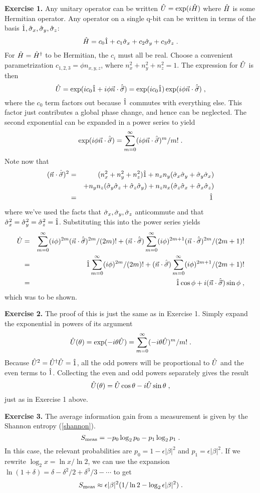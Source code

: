 {\bf Exercise 1.}  Any unitary operator can be written
${\hat U} = \exp(i{\hat H})$ where ${\hat H}$ is some Hermitian operator.  Any operator on
a single q-bit can be written in terms of the basis ${\hat 1},{\hat\sigma_x},{\hat\sigma_y},{\hat\sigma_z}$:
\[
{\hat H} = c_0 {\hat 1} + c_1 {\hat\sigma_x} + c_2 {\hat\sigma_y} + c_3 {\hat\sigma_z} \;.
\]
For ${\hat H}={\hat H}^\dagger$ to be Hermitian, the $c_i$ must all be real.  Choose
a convenient parametrization $c_{1,2,3} = \phi n_{x,y,z}$, where
$n_x^2 + n_y^2 + n_z^2 = 1$.  The expression for ${\hat U}$ is then
\[
{\hat U} = \exp(i c_0 {\hat 1} + i\phi{\vec n}\cdot{\hat{\vec\sigma}})
  = \exp(i c_0 {\hat 1}) \exp(i\phi{\vec n}\cdot{\hat{\vec\sigma}}) \;,
\]
where the $c_0$ term factors out because ${\hat 1}$ commutes with everything
else.  This factor just contributes a global phase change, and hence
can be neglected.  The second exponential can be expanded in a power
series to yield
\[
\exp(i\phi{\vec n}\cdot{\hat{\vec\sigma}})
  = \sum_{m=0}^\infty (i\phi{\vec n}\cdot{\hat{\vec\sigma}})^m/m! \;.
\]
Note now that
\begin{eqnarray}
({\vec n}\cdot{\hat{\vec\sigma}})^2 &=& (n_x^2+n_y^2+n_z^2) {\hat 1}
  + n_x n_y ({\hat\sigma_x}{\hat\sigma_y} + {\hat\sigma_y}{\hat\sigma_x}) \nonumber\\
&& + n_y n_z ({\hat\sigma_y}{\hat\sigma_z} + {\hat\sigma_z}{\hat\sigma_y})
  + n_z n_x ({\hat\sigma_z}{\hat\sigma_x} + {\hat\sigma_x}{\hat\sigma_z}) \nonumber\\
&=& {\hat 1} \, \nonumber
\end{eqnarray}
where we've used the facts that ${\hat\sigma_x},{\hat\sigma_y},{\hat\sigma_z}$ anticommute and that
${\hat\sigma_x}^2 = {\hat\sigma_y}^2 = {\hat\sigma_z}^2 = {\hat 1}$.  Substituting this into the power series
yields
\begin{eqnarray}
{\hat U} &=& \sum_{m=0}^\infty (i\phi)^{2m} ({\vec n}\cdot{\hat{\vec\sigma}})^{2m}/(2m)!
 + ({\vec n}\cdot{\hat{\vec\sigma}}) \sum_{m=0}^\infty (i\phi)^{2m+1}
  ({\vec n}\cdot{\hat{\vec\sigma}})^{2m}/(2m+1)! \nonumber\\
&=& {\hat 1} \sum_{m=0}^\infty (i\phi)^{2m}/(2m)!
 + ({\vec n}\cdot{\hat{\vec\sigma}}) \sum_{m=0}^\infty (i\phi)^{2m+1}/(2m+1)! \nonumber\\
&=& {\hat 1} \cos\phi + i({\vec n}\cdot{\hat{\vec\sigma}})\sin\phi \;, \nonumber
\end{eqnarray}
which was to be shown.

{\bf Exercise 2.}  The proof of this is just the same as in Exercise 1.
Simply expand the exponential in powers of its argument
\[
{\hat U}(\theta) = \exp(-i\theta{\hat U}) = \sum_{m=0}^\infty (-i\theta{\hat U})^m/m! \;.
\]
Because ${\hat U}^2={\hat U^\dagger}{\hat U}={\hat 1}$, all the odd
powers will be proportional to ${\hat U}$ and the even terms to ${\hat 1}$.
Collecting the even and odd powers separately gives the result
\[
{\hat U}(\theta) = {\hat U} \cos\theta - i {\hat U} \sin\theta \;,
\]
just as in Exercise 1 above.


{\bf Exercise 3.}  The average information gain from a
measurement is given by the Shannon entropy (\ref{shannon}).
\[
S_{\rm meas} = - p_0 \log_2 p_0 - p_1 \log_2 p_1 \;.
\]
In this case, the relevant probabilities are $p_0 = 1-\epsilon|\beta|^2$
and $p_1 = \epsilon|\beta|^2$.  If we rewrite $\log_2 x = \ln x/\ln 2$,
we can use the expansion $\ln(1+\delta) = \delta - \delta^2/2
+ \delta^3/3 - \cdots$ to get
\[
S_{\rm meas}
  \approx  \epsilon|\beta|^2(1/\ln 2 - \log_2 \epsilon|\beta|^2) \;.
\]

